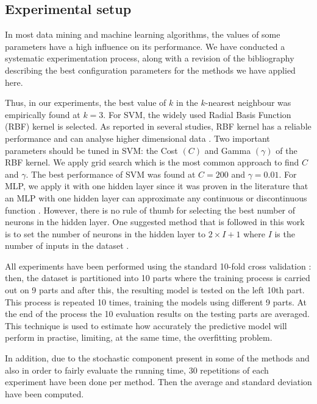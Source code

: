 \documentclass[a4paper,10pt,twocolumn,preprint,3p]{elsarticle}
\begin{document}

\subsection{Experimental setup}

In most data mining and machine learning algorithms, the values of some 
parameters have a high influence on its performance. We have conducted a 
systematic experimentation process, along with a revision of the bibliography 
describing the best configuration parameters for the methods we have applied here. 

Thus, in our experiments, the best value of $k$ in the $k$-nearest neighbour 
was empirically found at $k=3$. %
For SVM, the widely used Radial Basis Function (RBF) kernel is selected. 
As reported in several studies, RBF kernel has a reliable performance and 
can analyse higher dimensional data \cite{yu2004ec,chao2015construction}. 
Two important parameters should be tuned in SVM: the Cost $(C)$ and 
Gamma $(\gamma)$ of the RBF kernel. 
We apply grid search which is the most common approach to find $C$ and $\gamma$. 
The best performance of SVM was found at $C=200$ and $\gamma = 0.01$. 
For MLP, we apply it with one hidden layer since it was proven in the literature 
that an MLP with one hidden layer can approximate any continuous or discontinuous
function \cite{hornik1989multilayer,mirjalili2014let}. However, there
is no rule of thumb for selecting the best number of neurons in the
hidden layer. One suggested method that is followed in this work is to
set the number of neurons in the hidden layer to $2 \times I + 1$
where $I$ is the number of inputs in the dataset
\cite{wdaa2008differential,mirjalili2014let,mirjalili2015effective}. 

All experiments have been performed using the standard 10-fold cross validation \cite{Geisser1993,Kohavi1995,Devijver1982}: then, the dataset is partitioned into 10 parts where the training process is carried out on 9 parts and after this, the resulting model is tested on the left 10th part. This process is repeated 10 times, training the models using different 9 parts. At the end of the process the 10 evaluation results on the testing parts are averaged. 
This technique is used to estimate how accurately the predictive model will perform in practise, limiting, at the same time, the overfitting problem.

In addition, due to the stochastic component present in some of the methods and also in order to fairly evaluate the running time, 30 repetitions of each experiment have been done per method. Then the average and standard deviation have been computed.
\end{document}
